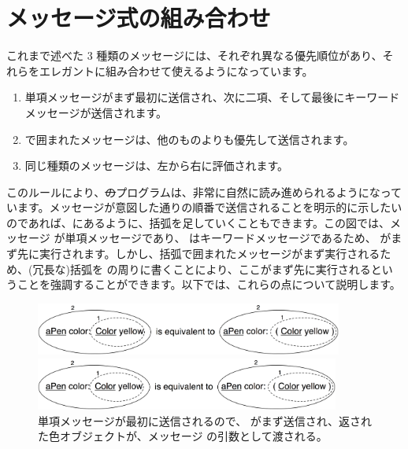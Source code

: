 \documentclass[a4paper,10pt,twoside]{book}
\begin{document}

\section{メッセージ式の組み合わせ}
これまで述べた 3 種類のメッセージには、それぞれ異なる優先順位があり、それらをエレガントに組み合わせて使えるようになっています。

\begin{enumerate}
\item 単項メッセージがまず最初に送信され、次に二項、そして最後にキーワードメッセージが送信されます。
\item {}で囲まれたメッセージは、他のものよりも優先して送信されます。
\item 同じ種類のメッセージは、左から右に評価されます。
\end{enumerate}

このルールにより、\st のプログラムは、非常に自然に読み進められるようになっています。メッセージが意図した通りの順番で送信されることを明示的に示したいのであれば、にあるように、括弧を足していくこともできます。この図では、メッセージ  が単項メッセージであり、 はキーワードメッセージであるため、 がまず先に実行されます。しかし、括弧で囲まれたメッセージがまず実行されるため、(冗長な)括弧を  の周りに書くことにより、ここがまず先に実行されるということを強調することができます。以下では、これらの点について説明します。

\begin{figure}[ht]
\ifluluelse
	{\centerline{\includegraphics[width=0.9\textwidth]{uKeyUn}} }
	{\centerline{\includegraphics[width=10cm]{uKeyUn}} }
\caption{単項メッセージが最初に送信されるので、 がまず送信され、返された色オブジェクトが、メッセージ  の引数として渡される。}
\end{figure}
\end{document}
